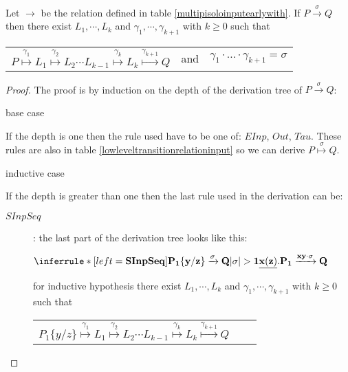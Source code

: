 \begin{proposition}\label{equivalencehightolowinput}
  Let $\rightarrow$ be the relation defined in table \ref{multipisoloinputearlywith}. If $P\xrightarrow{\sigma} Q$ then there exist $L_{1}, \cdots, L_{k}$ and $\gamma_{1}, \cdots, \gamma_{k+1}$ with $k\geq 0$ such that 
  \begin{center}
    \begin{tabular}{lll}
      $P \stackrel{\gamma_{1}}{\longmapsto} L_{1}  \stackrel{\gamma_{2}}{\longmapsto} L_{2} \cdots L_{k-1} \stackrel{\gamma_{k}}{\longmapsto} L_{k} \stackrel{\gamma_{k+1}}{\longmapsto} Q$ 
    &
      and
    &
      $\gamma_{1} \cdot \ldots \cdot \gamma_{k+1} = \sigma$  
    \end{tabular}
  \end{center}
  \begin{proof}
    The proof is by induction on the depth of the derivation tree of $P\xrightarrow{\sigma} Q$:
    \begin{description}
      \item[base case]
    \end{description}
	If the depth is one then the rule used have to be one of: $EInp$, $Out$, $Tau$. These rules are also in table \ref{lowleveltransitionrelationinput} so we can derive $P \stackrel{\sigma}{\longmapsto}Q$.
    \begin{description}
      \item[inductive case]
    \end{description}
	If the depth is greater than one then the last rule used in the derivation can be:
	\begin{description}
	  \item[$SInpSeq$]: 
	    the last part of the derivation tree looks like this:
	    \begin{center}
	      $\inferrule* [left=\bf{SInpSeq}]{
		  P_{1}\{y/z\} \xrightarrow{\sigma} Q
		\\
		  |\sigma|>1
	      }{
		\underline{x(z)}.P_{1} \xrightarrow{xy \cdot \sigma} Q
	      }$	      
	    \end{center}
	    for inductive hypothesis there exist $L_{1}, \cdots, L_{k}$ and $\gamma_{1}, \cdots, \gamma_{k+1}$ with $k\geq 0$ such that 
	    \begin{center}
	      \begin{tabular}{lll}
		$P_{1}\{y/z\} \stackrel{\gamma_{1}}{\longmapsto} L_{1} \stackrel{\gamma_{2}}{\longmapsto} L_{2} \cdots L_{k-1} \stackrel{\gamma_{k}}{\longmapsto} L_{k} \stackrel{\gamma_{k+1}}{\longmapsto} Q$ 

\end{tabular}
\end{center}
\end{description}
\end{proof}
\end{proposition}
